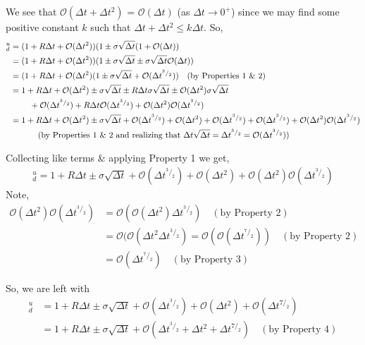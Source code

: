 \documentclass[12pt]{article}
\begin{document}
\noindent We see that $\mathcal O(\Delta t + \Delta t^2)$ = $\mathcal O(\Delta t)$ (as $\Delta t \longrightarrow 0^+$) since we may find some positive constant $k$ such that $\Delta t + \Delta t^2 \leq k\Delta t$. So,
\begin{align*}
	^u_d & = (1 + R\Delta t + \mathcal O(\Delta t^2))(1 \pm \sigma\sqrt{\Delta t}(1 + \mathcal O(\Delta t)) \\
	& = (1 + R\Delta t + \mathcal O(\Delta t^2))(1 \pm \sigma\sqrt{\Delta t} \pm \sigma\sqrt{\Delta t}\mathcal O(\Delta t)) \\ 
	& = (1 + R\Delta t + \mathcal O(\Delta t^2)(1 \pm \sigma\sqrt{\Delta t} + \mathcal O(\Delta t^{^3/_2})) \quad \text{(by Properties 1 \& 2)} \\
	& = 1 + R\Delta t + \mathcal O(\Delta t^2) \pm \sigma\sqrt{\Delta t} \pm R\Delta t\sigma\sqrt{\Delta t} \pm \mathcal O(\Delta t^2)\sigma\sqrt{\Delta t} \\ & \phantom{\hfill{12cm}} + \mathcal O(\Delta t^{^3/_2}) + R\Delta t\mathcal O(\Delta t^{^3/_2}) + \mathcal O(\Delta t^2)\mathcal O(\Delta t^{^3/_2}) \\
	& = 1 + R\Delta t + \mathcal O(\Delta t^2) \pm \sigma\sqrt{\Delta t} + \mathcal O(\Delta t^{^3/_2})  + \mathcal O(\Delta t^2) + \mathcal O(\Delta t^{^3/_2}) + \mathcal O(\Delta t^{^3/_2}) + \mathcal O(\Delta t^2)\mathcal O(\Delta t^{^3/_2}) \\
& \phantom{\hfill{12cm}} \quad \text{(by Properties 1 \& 2 and realizing that $\Delta t\sqrt{\Delta t} = \Delta t^{^3/_2} = \mathcal O(\Delta t^{^3/_2})$)}
\end{align*}

\noindent Collecting like terms \& applying Property 1 we get,
\begin{align*}
	^u_d = 1 + R\Delta t \pm \sigma\sqrt{\Delta t} + \mathcal O(\Delta t^{^3/_2}) + \mathcal O(\Delta t^2) + \mathcal O(\Delta t^2)\mathcal O(\Delta t^{^3/_2})
\end{align*}
Note,
\begin{align*}
	\mathcal O(\Delta t^2)\mathcal O(\Delta t^{^3/_2}) &= \mathcal O(\mathcal O(\Delta t^2)\Delta t^{^3/_2}) \quad (\text{by Property 2})\\
	&= \mathcal O(\mathcal O(\Delta t^2\Delta t^{^3/_2}) = \mathcal O(\mathcal O(\Delta t^{^7/_2})) \quad (\text{by Property 2})\\
	&= \mathcal O(\Delta t^{^7/_2}) \quad (\text{by Property 3})
\end{align*}

\noindent So, we are left with 
\begin{align*}
	^u_d &= 1 + R\Delta t \pm \sigma\sqrt{\Delta t} + \mathcal O(\Delta t^{^3/_2}) + \mathcal O(\Delta t^2) + \mathcal O(\Delta t^{7/_2})\\
	&=  1 + R\Delta t \pm \sigma\sqrt{\Delta t} + \mathcal O(\Delta t^{^3/_2} + \Delta t^2 + \Delta t^{7/_2}) \quad (\text{by Property 4})
\end{align*}
\end{document}
